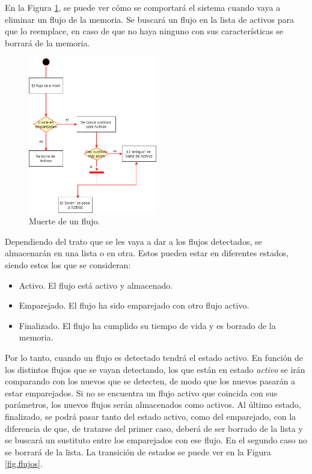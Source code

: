 \intro En la Figura \ref{fig.muerte}, se puede ver cómo se comportará el sistema cuando vaya a eliminar un flujo de la memoria. Se 
buscará un flujo en la lista de activos para que lo reemplace, en caso de que no haya ninguno con sus características se borrará de la 
memoria.

\begin{figure}[H]
  \includegraphics[width=0.5\textwidth]{imagenes/muerte.png}
  \centering
  \caption{Muerte de un flujo.}\label{fig.muerte}
\end{figure}

\intro Dependiendo del trato que se les vaya a dar a los flujos detectados, se almacenarán en una lista o en otra. Estos pueden estar 
en diferentes estados, siendo estos los que se consideran:

\begin{itemize}
\item Activo. El flujo está activo y almacenado.
\item Emparejado. El flujo ha sido emparejado con otro flujo activo.
\item Finalizado. El flujo ha cumplido su tiempo de vida y es borrado de la memoria.
\end{itemize}

\intro Por lo tanto, cuando un flujo es detectado tendrá el estado activo. En función 
de los distintos flujos que se vayan detectando, los que están en estado \textit{activo} se irán comparando con los nuevos que se detecten, de modo que los nuevos pasarán a estar emparejados. Si no se encuentra un flujo activo que coincida con sus parámetros, los nuevos flujos serán almacenados como activos. Al último estado, finalizado, se podrá pasar tanto del estado activo, como del emparejado, con la diferencia de que, de tratarse del primer caso, deberá de ser borrado de la lista y se buscará un sustituto entre los emparejados con ese flujo. En el segundo caso no se borrará de la lista. La transición de estados se puede ver en la Figura \ref{fig.flujos}.

